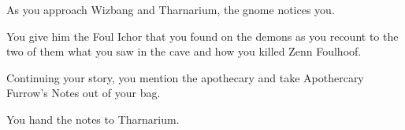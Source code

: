 As you approach Wizbang and Tharnarium, the gnome notices you.


You give him the Foul Ichor that you found on the demons as you recount to the two of them what you saw in the cave and how you killed Zenn Foulhoof.




Continuing your story, you mention the apothecary and take Apothercary Furrow's Notes out of your bag.


You hand the notes to Tharnarium.



